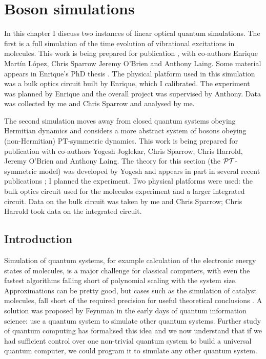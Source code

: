 \chapter{Boson simulations}
\label{ch:Simulations}
In this chapter I discuss two instances of linear optical quantum simulations.
The first is a full simulation of the time evolution of vibrational excitations
in molecules. This work is being prepared for publication \cite{molecules},
with co-authors Enrique Mart\'in L\'opez, Chris Sparrow Jeremy O'Brien and
Anthony Laing. Some material appears in Enrique's PhD thesis \cite{enrique}. The
physical platform used in this simulation was a bulk optics circuit built by
Enrique, which I calibrated. The experiment was planned by Enrique and the
overall project was supervised by Anthony. Data was collected by me and Chris
Sparrow and analysed by me.

The second simulation moves away from closed quantum systems obeying Hermitian
dynamics and considers a more abstract system of bosons obeying (non-Hermitian) 
PT-symmetric dynamics. This work is being prepared for publication
\cite{pt-prep} with co-authors Yogesh Joglekar, Chris Sparrow, Chris Harrold,
Jeremy O'Brien and Anthony Laing. The theory for this section (the
\(\mathcal{PT}\)-symmetric model) was developed by Yogesh and appears in part in several
recent publications \cite{yogesh03, yogesh04, yogesh17}; I planned the
experiment. Two physical platforms were used: the bulk optics circuit used for
the molecules experiment and a larger integrated circuit. Data on the bulk
circuit was taken by me and Chris Sparrow; Chris Harrold took data on the
integrated circuit.

\section{Introduction}
\label{sec:SimIntro}
Simulation of quantum systems, for example calculation of the electronic energy
states of molecules,
is a major challenge for classical computers, with even the fastest algorithms
falling short of polynomial scaling with the system size. Approximations can be
pretty good, but cases such as the simulation of catalyst molecules, fall short
of the required precision for useful theoretical conclusions
\cite{qsim-poulin}. A solution
was proposed by Feynman \cite{qsim-feynman} in the early days of quantum
information science: use a quantum system to simulate other quantum systems.
Further study of quantum computing has formalised this idea and we now
understand that if we had sufficient control over one non-trivial quantum system
to build a universal quantum computer, we could program it to simulate any other
quantum system.

